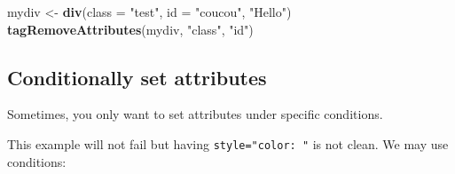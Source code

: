 \documentclass[
]{book}
\newenvironment{Shaded}{\begin{snugshade}}{\end{snugshade}}
\newcommand{\ControlFlowTok}[1]{\textcolor[rgb]{0.13,0.29,0.53}{\textbf{#1}}}
\newcommand{\DataTypeTok}[1]{\textcolor[rgb]{0.13,0.29,0.53}{#1}}
\newcommand{\KeywordTok}[1]{\textcolor[rgb]{0.13,0.29,0.53}{\textbf{#1}}}
\newcommand{\NormalTok}[1]{#1}
\newcommand{\OperatorTok}[1]{\textcolor[rgb]{0.81,0.36,0.00}{\textbf{#1}}}
\newcommand{\OtherTok}[1]{\textcolor[rgb]{0.56,0.35,0.01}{#1}}
\newcommand{\StringTok}[1]{\textcolor[rgb]{0.31,0.60,0.02}{#1}}
\begin{document}
\begin{Shaded}
\begin{Highlighting}[]
\NormalTok{mydiv <-}\StringTok{ }\KeywordTok{div}\NormalTok{(}\DataTypeTok{class =} \StringTok{"test"}\NormalTok{, }\DataTypeTok{id =} \StringTok{"coucou"}\NormalTok{, }\StringTok{"Hello"}\NormalTok{)}
\KeywordTok{tagRemoveAttributes}\NormalTok{(mydiv, }\StringTok{"class"}\NormalTok{, }\StringTok{"id"}\NormalTok{)}
\end{Highlighting}
\end{Shaded}

\hypertarget{conditionally-set-attributes}{%
\subsection{Conditionally set attributes}\label{conditionally-set-attributes}}

Sometimes, you only want to set attributes under specific conditions.

\begin{Shaded}
\end{Shaded}

This example will not fail but having \texttt{style="color:\ "} is not clean. We may use conditions:

\begin{Shaded}
\end{Shaded}
\end{document}
